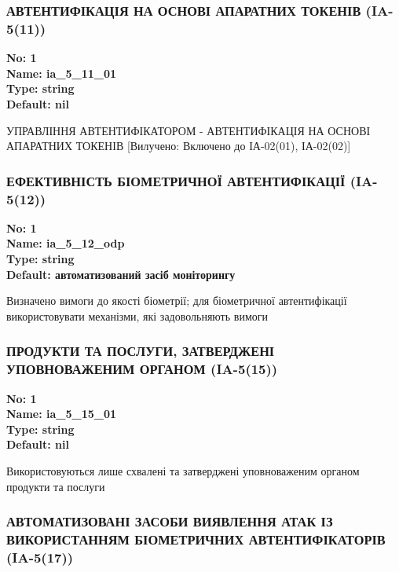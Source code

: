 \documentclass{article}
\begin{document}
\subsubsection{АВТЕНТИФІКАЦІЯ НА ОСНОВІ АПАРАТНИХ ТОКЕНІВ (IA-5(11))}


\vspace{10pt}
{\footnotesize\bfseries
No: 1\\
Name: ia\_5\_11\_01\\
Type: string\\
Default: nil
}

{\footnotesize УПРАВЛІННЯ АВТЕНТИФІКАТОРОМ - АВТЕНТИФІКАЦІЯ НА ОСНОВІ АПАРАТНИХ ТОКЕНІВ [Вилучено: Включено до ІА-02(01), ІА-02(02)]}




\subsubsection{ЕФЕКТИВНІСТЬ БІОМЕТРИЧНОЇ АВТЕНТИФІКАЦІЇ (IA-5(12))}


\vspace{10pt}
{\footnotesize\bfseries
No: 1\\
Name: ia\_5\_12\_odp\\
Type: string\\
Default: \textquotedbl{}автоматизований засіб моніторингу\textquotedbl{}
}

{\footnotesize Визначено вимоги до якості біометрії; для біометричної автентифікації використовувати механізми, які задовольняють вимоги}




\subsubsection{ПРОДУКТИ ТА ПОСЛУГИ, ЗАТВЕРДЖЕНІ УПОВНОВАЖЕНИМ ОРГАНОМ (IA-5(15))}


\vspace{10pt}
{\footnotesize\bfseries
No: 1\\
Name: ia\_5\_15\_01\\
Type: string\\
Default: nil
}

{\footnotesize Використовуються лише схвалені та затверджені уповноваженим органом продукти та послуги}




\subsubsection{АВТОМАТИЗОВАНІ ЗАСОБИ ВИЯВЛЕННЯ АТАК ІЗ ВИКОРИСТАННЯМ БІОМЕТРИЧНИХ АВТЕНТИФІКАТОРІВ (IA-5(17))}
\end{document}
